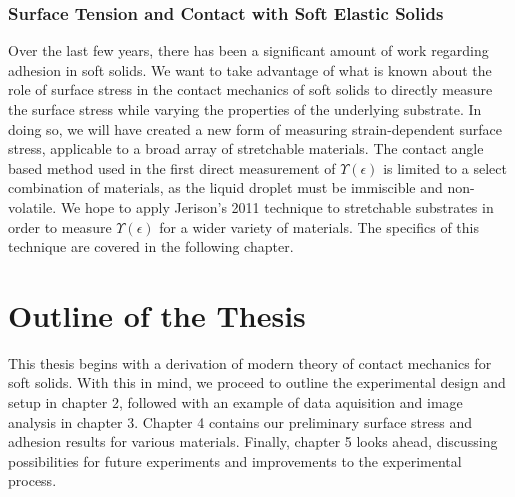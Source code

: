 

 



\subsubsection{Surface Tension and Contact with Soft Elastic Solids}
Over the last few years, there has been a significant amount of work regarding adhesion in soft solids. We want to take advantage of what is known about the role of surface stress in the contact mechanics of soft solids to directly measure the surface stress while varying the properties of the underlying substrate. In doing so, we will have created a new form of measuring strain-dependent surface stress, applicable to a broad array of stretchable materials. The contact angle based method used in the first direct measurement of $ \Upsilon(\epsilon) $ \cite{xu2017direct} is limited to a select combination of materials, as the liquid droplet must be immiscible and non-volatile. We hope to apply Jerison's 2011 technique to stretchable substrates in order to measure $ \Upsilon(\epsilon) $ for a wider variety of materials. The specifics of this technique are covered in the following chapter.

\section{Outline of the Thesis}
This thesis begins with a derivation of modern theory of contact mechanics for soft solids. With this in mind, we proceed to outline the experimental design and setup in chapter 2, followed with an example of data aquisition and image analysis in chapter 3. Chapter 4 contains our preliminary surface stress and adhesion results for various materials. Finally, chapter 5 looks ahead, discussing possibilities for future experiments and improvements to the experimental process.